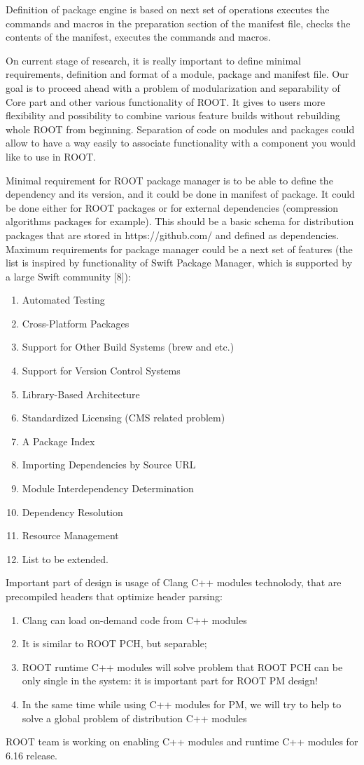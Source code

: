 \documentclass{webofc}
\begin{document}
Definition of package engine is based on next set of operations executes the commands and macros in the preparation section of the manifest file, checks the contents of the manifest, executes the commands and macros.

On current stage of research, it is really important  to define minimal requirements, definition and format of a module, package and manifest file. Our goal is to proceed ahead with a problem of modularization and separability of Core part and other various functionality of ROOT. It gives to users more flexibility and possibility to combine various feature builds without rebuilding whole ROOT from beginning. Separation of code on modules and packages could allow to have  a way easily to associate functionality with a component you would like to use in ROOT.

Minimal requirement for ROOT package manager is  to be able to define the dependency and its version, and it could be done in manifest of package. It could be done either for ROOT packages or for external dependencies (compression algorithms packages for example). This should be a basic schema for distribution packages that are stored in  https://github.com/ and defined as dependencies.
Maximum requirements for package manager could be a next set of features (the list is inspired by functionality of Swift Package Manager, which is supported by a large Swift community [8]):
\begin{enumerate}
\item Automated Testing
\item Cross-Platform Packages
\item Support for Other Build Systems (brew and etc.)
\item Support for Version Control Systems
\item Library-Based Architecture
\item Standardized Licensing (CMS related problem)
\item A Package Index
\item Importing Dependencies by Source URL
\item Module Interdependency Determination
\item Dependency Resolution
\item Resource Management
\item List to be extended.
\end{enumerate}

Important part of design is usage of Clang C++ modules technolody, that are precompiled headers that optimize header parsing:
\begin{enumerate}
\item Clang can load on-demand code from C++ modules
\item It is similar to ROOT PCH, but separable;
\item ROOT runtime C++ modules will solve problem that ROOT PCH can be only single in the system: it is important part for ROOT PM design!
\item In the same time while using C++ modules for PM, we will try to help to solve a global problem of distribution C++ modules
\end{enumerate}
ROOT team is working on enabling C++ modules and runtime C++ modules for 6.16 release.
\end{document}
